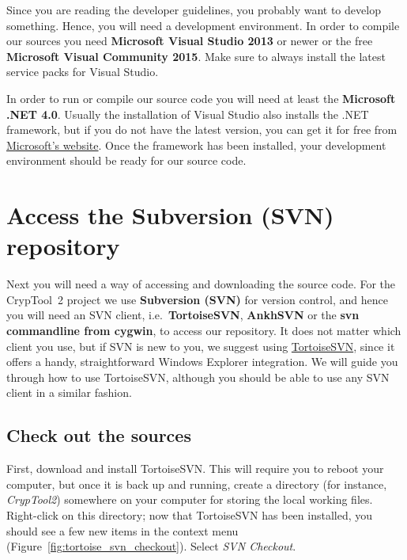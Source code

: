 Since you are reading the developer guidelines, you probably want to develop something. Hence, you will need a development environment. In order to compile our sources you need \textbf{Microsoft Visual Studio 2013} or newer or the free \textbf{Microsoft Visual Community 2015}. Make sure to always install the latest service packs for Visual Studio.

In order to run or compile our source code you will need at least the \textbf{Microsoft .NET 4.0}. Usually the installation of Visual Studio also installs the .NET framework, but if you do not have the latest version, you can get it for free from \href{http://www.microsoft.com/downloads/details.aspx?FamilyID=9cfb2d51-5ff4-4491-b0e5-b386f32c0992}{Microsoft's website}. Once the framework has been installed, your development environment should be ready for our source code.
\clearpage

\section{Access the Subversion (SVN) repository}
\label{AccessingSubversion}

Next you will need a way of accessing and downloading the source code. For the CrypTool~2 project we use \textbf{Subversion (SVN)} for version control, and hence you will need an SVN client, i.e.\ \textbf{TortoiseSVN}, \textbf{AnkhSVN} or the \textbf{svn commandline from cygwin}, to access our repository. It does not matter which client you use, but if SVN is new to you, we suggest using \href{http://www.tortoisesvn.net/}{TortoiseSVN}, since it offers a handy, straightforward Windows Explorer integration. We will guide you through how to use TortoiseSVN, although you should be able to use any SVN client in a similar fashion.

\subsection{Check out the sources}
\label{CheckingOutTheSources}

First, download and install TortoiseSVN. This will require you to reboot your computer, but once it is back up and running, create a directory (for instance, \textit{CrypTool2}) somewhere on your computer for storing the local working files. Right-click on this directory; now that TortoiseSVN has been installed, you should see a few new items in the context menu (Figure~\ref{fig:tortoise_svn_checkout}). Select \textit{SVN Checkout}.

